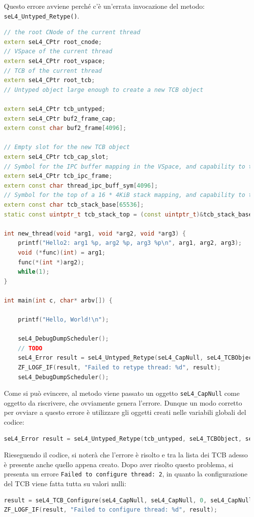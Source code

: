 Questo errore avviene perché c'è un'errata invocazione del metodo: \texttt{seL4\_Untyped\_Retype()}.
\begin{lstlisting}[language=C++]
// the root CNode of the current thread
extern seL4_CPtr root_cnode;
// VSpace of the current thread
extern seL4_CPtr root_vspace;
// TCB of the current thread
extern seL4_CPtr root_tcb;
// Untyped object large enough to create a new TCB object

extern seL4_CPtr tcb_untyped;
extern seL4_CPtr buf2_frame_cap;
extern const char buf2_frame[4096];

// Empty slot for the new TCB object
extern seL4_CPtr tcb_cap_slot;
// Symbol for the IPC buffer mapping in the VSpace, and capability to the mapping
extern seL4_CPtr tcb_ipc_frame;
extern const char thread_ipc_buff_sym[4096];
// Symbol for the top of a 16 * 4KiB stack mapping, and capability to the mapping
extern const char tcb_stack_base[65536];
static const uintptr_t tcb_stack_top = (const uintptr_t)&tcb_stack_base + sizeof(tcb_stack_base);

int new_thread(void *arg1, void *arg2, void *arg3) {
    printf("Hello2: arg1 %p, arg2 %p, arg3 %p\n", arg1, arg2, arg3);
    void (*func)(int) = arg1;
    func(*(int *)arg2);
    while(1);
}

int main(int c, char* arbv[]) {

    printf("Hello, World!\n");

    seL4_DebugDumpScheduler();
	// TODO
    seL4_Error result = seL4_Untyped_Retype(seL4_CapNull, seL4_TCBObject, seL4_TCBBits, seL4_CapNull, 0, 0, seL4_CapNull, 1);
    ZF_LOGF_IF(result, "Failed to retype thread: %d", result);
    seL4_DebugDumpScheduler();
\end{lstlisting}

Come si può evincere, al metodo viene passato un oggetto \texttt{seL4\_CapNull} come oggetto da riscrivere, che ovviamente genera l'errore. Dunque un modo corretto per ovviare a questo errore è utilizzare gli oggetti creati nelle variabili globali del codice:
\begin{lstlisting}[language=C++]
seL4_Error result = seL4_Untyped_Retype(tcb_untyped, seL4_TCBObject, seL4_TCBBits, root_cnode, 0, 0, tcb_cap_slot, 1);
\end{lstlisting}

Rieseguendo il codice, si noterà che l'errore è risolto e tra la lista dei TCB adesso è presente anche quello appena creato. Dopo aver risolto questo problema, si presenta un errore \texttt{Failed to configure thread: 2}, in quanto la configurazione del TCB viene fatta tutta su valori nulli:
\begin{lstlisting}[language=C++]
result = seL4_TCB_Configure(seL4_CapNull, seL4_CapNull, 0, seL4_CapNull, 0, 0, (seL4_Word) NULL, seL4_CapNull);
ZF_LOGF_IF(result, "Failed to configure thread: %d", result);
\end{lstlisting}

